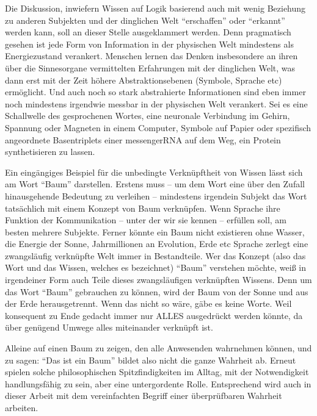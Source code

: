Die Diskussion, inwiefern Wissen auf Logik basierend auch mit wenig Beziehung zu anderen Subjekten und der dinglichen Welt \enquote{erschaffen} oder \enquote{erkannt} werden kann, soll an dieser Stelle ausgeklammert werden. Denn pragmatisch gesehen ist jede Form von Information in der physischen Welt mindestens als Energiezustand verankert. Menschen lernen das Denken insbesondere an ihren über die Sinnesorgane vermittelten Erfahrungen mit der dinglichen Welt, was dann erst mit der Zeit höhere Abstraktionsebenen (Symbole, Sprache \gls{etc}) ermöglicht. Und auch noch so stark abstrahierte Informationen sind eben immer noch mindestens irgendwie messbar in der physischen Welt verankert. Sei es eine Schallwelle des gesprochenen Wortes, eine neuronale Verbindung im Gehirn, Spannung oder Magneten in einem Computer, Symbole auf Papier oder spezifisch angeordnete Basentriplets einer messengerRNA auf dem Weg, ein Protein synthetisieren zu lassen. 

Ein eingängiges Beispiel für die unbedingte Verknüpftheit von Wissen lässt sich am Wort \enquote{Baum} darstellen. Erstens muss -- um dem Wort eine über den Zufall hinausgehende Bedeutung zu verleihen -- mindestens irgendein Subjekt das Wort tatsächlich mit einem Konzept von Baum verknüpfen. Wenn Sprache ihre Funktion der Kommunikation -- unter der wir sie kennen -- erfüllen soll, am besten mehrere Subjekte.
Ferner könnte ein Baum nicht existieren ohne Wasser, die Energie der Sonne, Jahrmillionen an Evolution, Erde \gls{etc} Sprache zerlegt eine zwangsläufig verknüpfte Welt immer in Bestandteile. 
Wer das Konzept (also das Wort und das Wissen, welches es bezeichnet) \enquote{Baum} verstehen möchte, weiß in irgendeiner Form auch Teile dieses zwangsläufigen verknüpften Wissens. Denn um das Wort \enquote{Baum} gebrauchen zu können, wird der Baum von der Sonne und aus der Erde herausgetrennt. Wenn das nicht so wäre, gäbe es keine Worte. Weil konsequent zu Ende gedacht immer nur ALLES ausgedrückt werden könnte, da über genügend Umwege alles miteinander verknüpft ist.
\bigskip

Alleine auf einen Baum zu zeigen, den alle Anwesenden wahrnehmen können, und zu sagen: \enquote{Das ist ein Baum} bildet also nicht die ganze Wahrheit ab. Erneut spielen solche philosophischen Spitzfindigkeiten im Alltag, mit der Notwendigkeit handlungsfähig zu sein, aber eine untergordente Rolle. Entsprechend wird auch in dieser Arbeit mit dem vereinfachten Begriff einer überprüfbaren Wahrheit arbeiten. 


